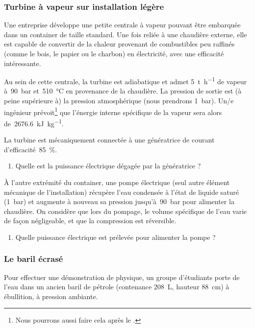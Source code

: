 \subsubsection{Turbine à vapeur sur installation légère}
\label{exo_turbine_vapeur_legere}

	Une entreprise développe une petite centrale à vapeur pouvant être embarquée dans un container de taille standard. Une fois reliée à une chaudière externe, elle est capable de convertir de la chaleur provenant de combustibles peu raffinés (comme le bois, le papier ou le charbon) en électricité, avec une efficacité intéressante.
	
	Au sein de cette centrale, la turbine est adiabatique et admet \SI{5}{\tonne\per\hour} de vapeur à~\SI{90}{\bar} et~\SI{510}{\degreeCelsius} en provenance de la chaudière. La pression de sortie est (à peine supérieure à) la pression atmosphérique (nous prendrons \SI{1}{\bar}). Un/e ingénieur prévoit\footnote{Nous pourrons aussi faire cela après le \courshuit.} que l’énergie interne spécifique de la vapeur sera alors de~\SI{2676,6}{\kilo\joule\per\kilogram}.
	
	La turbine est mécaniquement connectée à une génératrice de courant d’efficacité~\SI{85}{\percent}.
	
	\begin{enumerate}
		\item Quelle est la puissance électrique dégagée par la génératrice ?
	\end{enumerate}
	
	À l’autre extrémité du container, une pompe électrique (seul autre élément mécanique de l’installation) récupère l’eau condensée à l’état de liquide saturé (\SI{1}{\bar}) et augmente à nouveau sa pression jusqu’à~\SI{90}{\bar} pour alimenter la chaudière. On considère que lors du pompage, le volume spécifique de l’eau varie de façon négligeable, et que la compression est réversible.
	
	\begin{enumerate}
		\item Quelle puissance électrique est prélevée pour alimenter la pompe ?
	\end{enumerate}
	



\subsubsection{Le baril écrasé}
\label{exo_baril}

	Pour effectuer une démonstration de physique, un groupe d’étudiants porte de l’eau  dans un ancien baril de pétrole (contenance \SI{208}{\liter}, hauteur \SI{88}{\centi\metre}) à ébullition, à pression ambiante.
	

